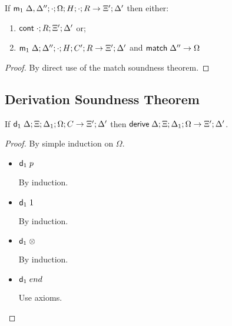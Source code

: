 \begin{theorem}
If $\mathsf{m}_1 \; \Delta, \Delta''; \cdot; \Omega; H; \cdot; R \rightarrow \Xi'; \Delta'$ then either:
\begin{enumerate}
   \item $\mathsf{cont} \; \cdot; R; \Xi'; \Delta'$ or;
   \item $\mathsf{m}_1 \; \Delta; \Delta''; \cdot; H; C'; R \rightarrow \Xi'; \Delta'$ and $\mathsf{match} \; \Delta'' \rightarrow \Omega$
\end{enumerate}
\end{theorem}

\begin{proof}
By direct use of the match soundness theorem.
\end{proof}

\subsection{Derivation Soundness Theorem}

\begin{theorem}
If $\mathsf{d}_1 \; \Delta; \Xi; \Delta_1; \Omega; C \rightarrow \Xi'; \Delta'$ then $\mathsf{derive} \; \Delta; \Xi; \Delta_1; \Omega \rightarrow \Xi'; \Delta'$.
\end{theorem}

\begin{proof}
By simple induction on $\Omega$.

\begin{itemize}
   \item $\mathsf{d}_1 \; p$
   
   By induction.
   
   \item $\mathsf{d}_1 \; 1$
   
   By induction.
   
   \item $\mathsf{d}_1 \; \otimes$
   
   By induction.
   
   \item $\mathsf{d}_1 \; end$
   
   Use axioms.
   
\end{itemize}
\end{proof}